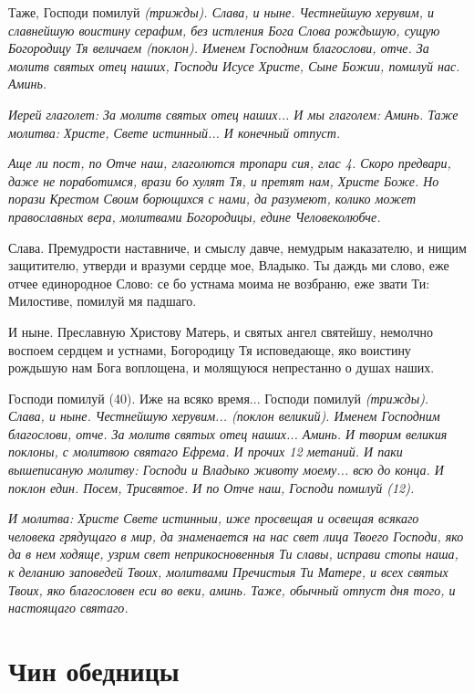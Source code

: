 Таже, Господи помилуй \itshape (трижды)\normalfont{}. Слава, и ныне. Честнейшую херувим, и славнейшую воистину серафим, без истления Бога Слова рождьшую, сущую Богородицу Тя величаем \itshape (поклон)\normalfont{}. Именем Господним благослови, отче. За молитв святых отец наших, Господи Исусе Христе, Сыне Божии, помилуй нас. Аминь.


\itshape Иерей глаголет:\normalfont{} За молитв святых отец наших... И мы глаголем: Аминь. Таже молитва: Христе, Свете истинный... И конечный отпуст.


\itshape Аще ли пост, по Отче наш, глаголются тропари сия, глас 4.\normalfont{} Скоро предвари, даже не поработимся, врази бо хулят Тя, и претят нам, Христе Боже. Но порази Крестом Своим борющихся с нами, да разумеют, колико может православных вера, молитвами Богородицы, едине Человеколюбче.


Слава. Премудрости наставниче, и смыслу давче, немудрым наказателю, и нищим защитителю, утверди и вразуми сердце мое, Владыко. Ты даждь ми слово, еже отчее единородное Слово: се бо устнама моима не возбраню, еже звати Ти: Милостиве, помилуй мя падшаго.


И ныне. Преславную Христову Матерь, и святых ангел святейшу, немолчно воспоем сердцем и устнами, Богородицу Тя исповедающе, яко воистину рождьшую нам Бога воплощена, и молящуюся непрестанно о душах наших.


Господи помилуй (40). Иже на всяко время... Господи помилуй \itshape (трижды)\normalfont{}. Слава, и ныне. Честнейшую херувим... (поклон великий). Именем Господним благослови, отче. За молитв святых отец наших... Аминь. И творим великия поклоны, с молитвою святаго Ефрема. И прочих 12 метаний. И паки вышеписаную молитву: Господи и Владыко животу моему... всю до конца. И поклон един. Посем, Трисвятое. И по Отче наш, Господи помилуй (12).


\itshape И молитва:\normalfont{} Христе Свете истинныи, иже просвещая и освещая всякаго человека грядущаго в мир, да знаменается на нас свет лица Твоего Господи, яко да в нем ходяще, узрим свет неприкосновенныя Ти славы, исправи стопы наша, к деланию заповедей Твоих, молитвами Пречистыя Ти Матере, и всех святых Твоих, яко благословен еси во веки, аминь. Таже, обычный отпуст дня того, и настоящаго святаго.




\section{Чин обедницы}
 


